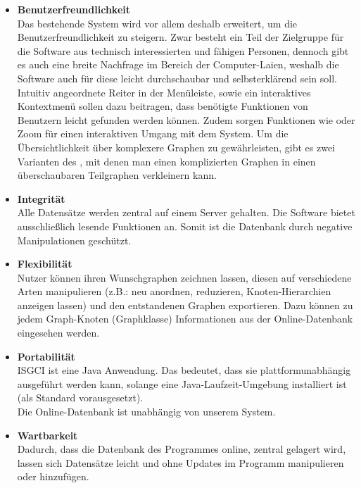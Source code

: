 \documentclass[10pt,a4paper]{article}
\newcommand{\G}[1]{\glqq\text{#1}\grqq} %
\begin{document}
\begin{itemize}	
		\item \textbf{Benutzerfreundlichkeit}\\
		Das bestehende System wird vor allem deshalb erweitert, um die Benutzerfreundlichkeit zu steigern. Zwar besteht ein Teil der Zielgruppe für die Software aus technisch interessierten und fähigen Personen, dennoch gibt es auch eine breite Nachfrage im Bereich der Computer-Laien, weshalb die Software auch für diese leicht durchschaubar und selbsterklärend sein soll. Intuitiv angeordnete Reiter in der Menüleiste, sowie ein interaktives Kontextmenü sollen dazu beitragen, dass benötigte Funktionen von Benutzern leicht gefunden werden können. Zudem sorgen Funktionen wie \G{Grab\&Pull} oder Zoom für einen interaktiven Umgang mit dem System. Um die Übersichtlichkeit über komplexere Graphen zu gewährleisten, gibt es zwei Varianten des \G{Expanding/Collapsing}, mit denen man einen komplizierten Graphen in einen überschaubaren Teilgraphen verkleinern kann.
		\item \textbf{Integrität}\\
		Alle Datensätze werden zentral auf einem Server gehalten. Die Software bietet ausschließlich lesende Funktionen an. Somit ist die Datenbank durch negative Manipulationen geschützt.
		\item \textbf{Flexibilität}\\
		Nutzer können ihren Wunschgraphen zeichnen lassen, diesen auf verschiedene Arten manipulieren (z.B.: neu anordnen, reduzieren, Knoten-Hierarchien anzeigen lassen) und den entstandenen Graphen exportieren. Dazu können zu jedem Graph-Knoten (Graphklasse) Informationen aus der Online-Datenbank eingesehen werden.  
		\item \textbf{Portabilität}\\
		ISGCI ist eine Java Anwendung. Das bedeutet, dass sie plattformunabhängig ausgeführt werden kann, solange eine Java-Laufzeit-Umgebung installiert ist (als Standard vorausgesetzt).\\
		Die Online-Datenbank ist unabhängig von unserem System. 
		\item \textbf{Wartbarkeit}\\
		Dadurch, dass die Datenbank des Programmes online, zentral gelagert wird, lassen sich Datensätze leicht und ohne Updates im Programm manipulieren oder hinzufügen.
		\end{itemize}

\newpage
\end{document}
